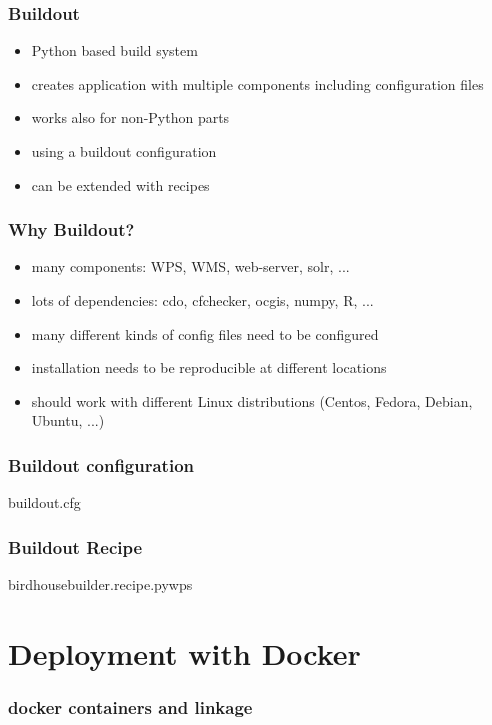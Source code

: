 \documentclass{beamer}
\begin{document}
  \begin{frame}
    \frametitle{Buildout}
    \begin{itemize}
      \item Python based build system
      \item creates application with multiple components including configuration files
      \item works also for non-Python parts
      \item using a buildout configuration 
      \item can be extended with recipes
    \end{itemize}
  \end{frame}

  \begin{frame}
    \frametitle{Why Buildout?}
    \begin{itemize}
      \item many components: WPS, WMS, web-server, solr, ...
      \item lots of dependencies: cdo, cfchecker, ocgis, numpy, R, ...
      \item many different kinds of config files need to be configured 
      \item installation needs to be reproducible at different locations
      \item should work with different Linux distributions (Centos, Fedora, Debian, Ubuntu, ...)
    \end{itemize}
  \end{frame}

  \begin{frame}[shrink]
    \frametitle{Buildout configuration}
    \begin{block}{buildout.cfg}
      
    \end{block}
\end{frame}

  \begin{frame}[shrink]
    \frametitle{Buildout Recipe}
    \begin{block}{birdhousebuilder.recipe.pywps}
      
    \end{block}
\end{frame}


  \section{Deployment with Docker}

  \begin{frame}
    \frametitle{docker containers and linkage}
  \end{frame}
\end{document}
